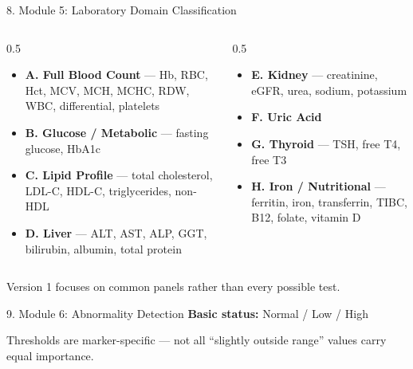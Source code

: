 \documentclass[10pt,aspectratio=169]{beamer}
\begin{document}
\begin{frame}{8. Module 5: Laboratory Domain Classification}
\scriptsize
\begin{columns}[T]
\begin{column}{0.5\textwidth}
\begin{itemize}
\item \textbf{A. Full Blood Count} --- Hb, RBC, Hct, MCV, MCH, MCHC, RDW, WBC, differential, platelets
\item \textbf{B. Glucose / Metabolic} --- fasting glucose, HbA1c
\item \textbf{C. Lipid Profile} --- total cholesterol, LDL-C, HDL-C, triglycerides, non-HDL
\item \textbf{D. Liver} --- ALT, AST, ALP, GGT, bilirubin, albumin, total protein
\end{itemize}
\end{column}
\begin{column}{0.5\textwidth}
\begin{itemize}
\item \textbf{E. Kidney} --- creatinine, eGFR, urea, sodium, potassium
\item \textbf{F. Uric Acid}
\item \textbf{G. Thyroid} --- TSH, free T4, free T3
\item \textbf{H. Iron / Nutritional} --- ferritin, iron, transferrin, TIBC, B12, folate, vitamin D
\end{itemize}
\end{column}
\end{columns}
\vfill
\normalsize Version 1 focuses on common panels rather than every possible test.
\end{frame}

\begin{frame}{9. Module 6: Abnormality Detection}
\textbf{Basic status:} Normal / Low / High
\vspace{6pt}
\begin{center}
\end{center}
\vfill
Thresholds are marker-specific --- not all ``slightly outside range'' values carry equal importance.
\end{frame}
\end{document}
